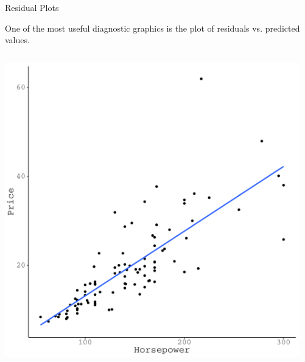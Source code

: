 \documentclass[10pt]{beamer}\usepackage[]{graphicx}\usepackage[]{color}
\makeatletter
\def\maxwidth{ %
  \ifdim\Gin@nat@width>\linewidth
    \linewidth
  \else
    \Gin@nat@width
  \fi
}
\newenvironment{knitrout}{}{} %
\makeatother
\begin{document}
\begin{frame}{Residual Plots}

  One of the most useful diagnostic graphics is the plot of residuals vs.
  predicted values.

\vb

\begin{columns}
\begin{column}{0.5\textwidth}

  
\begin{knitrout}\footnotesize
{}\color{fgcolor}

{\centering \includegraphics[width=\maxwidth]{figure/assumptions-unnamed-chunk-1-1} 

}


\end{knitrout}
\end{column}
\begin{column}{0.5\textwidth}

\begin{knitrout}\footnotesize
{}\color{fgcolor}


\end{knitrout}
\end{column}
\end{columns}
\end{frame}
\end{document}
